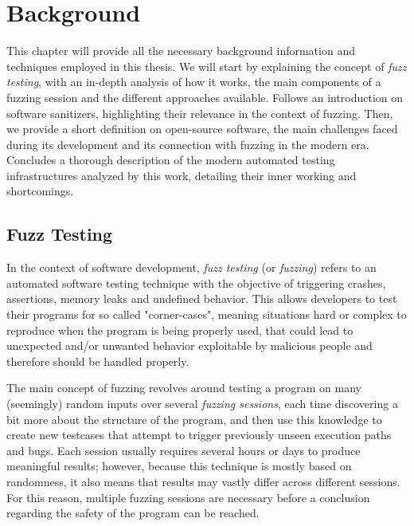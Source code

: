 \chapter{Background} \label{chap_2}


This chapter will provide all the necessary background information and techniques employed in this thesis.
We will start by explaining the concept of \textit{fuzz testing}, with an in-depth analysis of how it works, the main components of a fuzzing session and the different approaches available.
Follows an introduction on software sanitizers, highlighting their relevance in the context of fuzzing.
Then, we provide a short definition on open-source software, the main challenges faced during its development and its connection with fuzzing in the modern era.
Concludes a thorough description of the modern automated testing infrastructures analyzed by this work, detailing their inner working and shortcomings.



\section{Fuzz Testing}


In the context of software development, \textit{fuzz testing} (or \textit{fuzzing}) refers to an automated software testing technique with the objective of triggering crashes, assertions, memory leaks and undefined behavior. This allows developers to test their programs for so called "corner-cases", meaning situations hard or complex to reproduce when the program is being properly used, that could lead to unexpected and/or unwanted behavior exploitable by malicious people and therefore should be handled properly.

The main concept of fuzzing revolves around testing a program on many (seemingly) random inputs over several \textit{fuzzing sessions}, each time discovering a bit more about the structure of the program, and then use this knowledge to create new testcases that attempt to trigger previously unseen execution paths and bugs. Each session usually requires several hours or days to produce meaningful results; however, because this technique is mostly based on randomness, it also means that results may vastly differ across different sessions. For this reason, multiple fuzzing sessions are necessary before a conclusion regarding the safety of the program can be reached.

